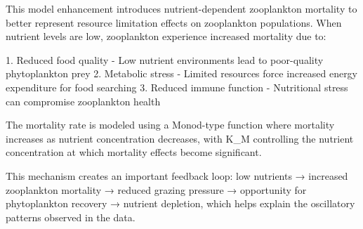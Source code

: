 This model enhancement introduces nutrient-dependent zooplankton mortality to better represent resource limitation effects on zooplankton populations. When nutrient levels are low, zooplankton experience increased mortality due to:

1. Reduced food quality - Low nutrient environments lead to poor-quality phytoplankton prey
2. Metabolic stress - Limited resources force increased energy expenditure for food searching
3. Reduced immune function - Nutritional stress can compromise zooplankton health

The mortality rate is modeled using a Monod-type function where mortality increases as nutrient concentration decreases, with K_M controlling the nutrient concentration at which mortality effects become significant.

This mechanism creates an important feedback loop: low nutrients → increased zooplankton mortality → reduced grazing pressure → opportunity for phytoplankton recovery → nutrient depletion, which helps explain the oscillatory patterns observed in the data.
